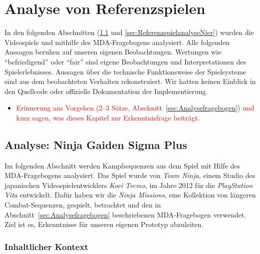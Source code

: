 \documentclass[../Main.tex]{subfiles}
\begin{document}
\section{Analyse von Referenzspielen} \label{sec:Referenzspielanalyse}

In den folgenden Abschnitten (\ref{sec:ReferenzspielanalyseNinja} und \ref{sec:ReferenzspielanalyseNier}) wurden die Videospiele  und  mithilfe des MDA-Fragebogens analysiert. Alle folgenden Aussagen beruhen auf unseren eigenen Beobachtungen. Wertungen wie \enquote{befriedigend} oder \enquote{fair} sind eigene Beobachtungen und Interpretationen des Spielerlebnisses. Aussagen über die technische Funktionsweise der Spielsysteme sind aus dem beobachteten Verhalten rekonstruiert. Wir hatten keinen Einblick in den Quellcode oder offizielle Dokumentation der Implementierung.

\begin{itemize}[leftmargin=1.5cm]
    \item \textcolor{red}{Erinnerung ans Vorgehen (2--3 Sätze, Abschnitt~\ref{sec:Analysefragebogen}) und kurz sagen, was dieses Kapitel zur Erkenntnisfrage beiträgt.}
\end{itemize}

\subsection{Analyse: Ninja Gaiden Sigma Plus} \label{sec:ReferenzspielanalyseNinja}

Im folgenden Abschnitt werden Kampfsequenzen aus dem Spiel  mit Hilfe des MDA-Fragebogens analysiert. Das Spiel wurde von \textit{Team Ninja}, einem Studio des japanischen Videospielentwicklers \textit{Koei Tecmo}, im Jahre 2012 für die \textit{PlayStation Vita} entwickelt.\autocite{wikipedia_ninjagaiden_2026} Dafür haben wir die \textit{Ninja Missions}, eine Kollektion von längeren Combat-Sequenzen, gespielt, betrachtet und den in Abschnitt~\ref{sec:Analysefragebogen} beschriebenen MDA-Fragebogen verwendet. Ziel ist es, Erkenntnisse für unseren eigenen Prototyp abzuleiten.

\subsubsection{Inhaltlicher Kontext}
\end{document}
